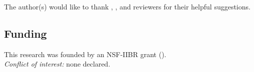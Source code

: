 The author(s) would like to thank , , and
 reviewers for their helpful suggestions.

\subsection*{Funding}
This research was founded by an NSF-IIBR grant ().\\

\noindent \textit{Conflict of interest:} none declared.


\nolinenumbers


